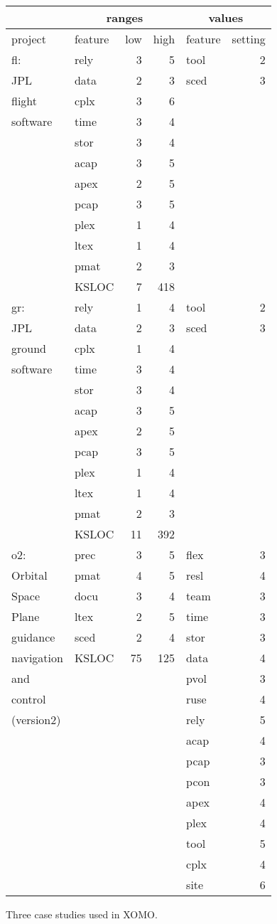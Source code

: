 \begin{figure} 
\begin{center}
\scriptsize
\begin{tabular}{l|lrr|lr}
       &\multicolumn{3}{c|}{ranges}      &\multicolumn{2}{c}{values}\\\hline
project&feature&low&high&feature&setting\\\hline


fl:&rely&3&5&tool&2\\
JPL &data&2&3&sced&3\\
flight&cplx&3&6&&\\
software&time&3&4&&\\
&stor&3&4&&\\
&acap&3&5&&\\
&apex&2&5&&\\
&pcap&3&5&&\\
&plex&1&4&&\\
&ltex&1&4&&\\
&pmat&2&3&&\\
&KSLOC&7&418&&\\\hline
gr:&rely&1&4&tool&2\\
JPL &data&2&3&sced&3\\
ground&cplx&1&4&&\\
software&time&3&4&&\\
&stor&3&4&&\\
&acap&3&5&&\\
&apex&2&5&&\\
&pcap&3&5&&\\
&plex&1&4&&\\
&ltex&1&4&&\\
&pmat&2&3&&\\
&KSLOC&11&392&&\\\hline
o2:&prec&3&5&flex&3\\
Orbital &pmat&4&5&resl&4\\
Space&docu&3&4&team&3\\
Plane&ltex&2&5&time&3\\
guidance&sced&2&4&stor&3\\
navigation&KSLOC&75&125&data&4\\
and&&&&pvol&3\\
control&&&&ruse&4\\
(version2)&&&&rely&5\\
&&&&acap&4\\
&&&&pcap&3\\
&&&&pcon&3\\
&&&&apex&4\\
&&&&plex&4\\
&&&&tool&5\\
&&&&cplx&4\\
&&&&site&6\\
\end{tabular}
\end{center}
\caption{Three case studies used in XOMO.}\label{fig:xomocases}
\end{figure}
